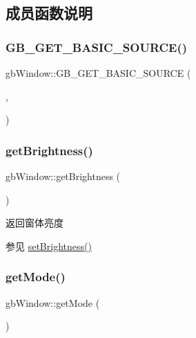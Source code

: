 \subsection{成员函数说明}
\mbox{\label{classgb_window_a7a24cdcd80201982dca8944b073a76f9}} 
\subsubsection{\texorpdfstring{GB\_GET\_BASIC\_SOURCE()}{GB\_GET\_BASIC\_SOURCE()}}
{\footnotesize\ttfamily gb\+Window\+::\+G\+B\+\_\+\+G\+E\+T\+\_\+\+B\+A\+S\+I\+C\+\_\+\+S\+O\+U\+R\+CE (\begin{DoxyParamCaption}\item[{S\+D\+L\+\_\+\+Window $\ast$}]{,  }\item[{\mbox{\hyperlink{classgb_window_a1faf26696f9974e05cae77fb240a502e}{window}}}]{ }\end{DoxyParamCaption})}

\mbox{\label{classgb_window_aa5a6dbbedb1b0421c5ce41753df71ba3}} 
\subsubsection{\texorpdfstring{getBrightness()}{getBrightness()}}
{\footnotesize\ttfamily gb\+Window\+::get\+Brightness (\begin{DoxyParamCaption}{ }\end{DoxyParamCaption})}



返回窗体亮度 

\begin{DoxySeeAlso}{参见}
\mbox{\hyperlink{classgb_window_aec17f885a0d2dcf1a6d281799542071a}{set\+Brightness()}} 
\end{DoxySeeAlso}
\mbox{\label{classgb_window_af86a84effc2ab72df5dfa881c5e6d620}} 
\subsubsection{\texorpdfstring{getMode()}{getMode()}}
{\footnotesize\ttfamily gb\+Window\+::get\+Mode (\begin{DoxyParamCaption}{ }\end{DoxyParamCaption})}



